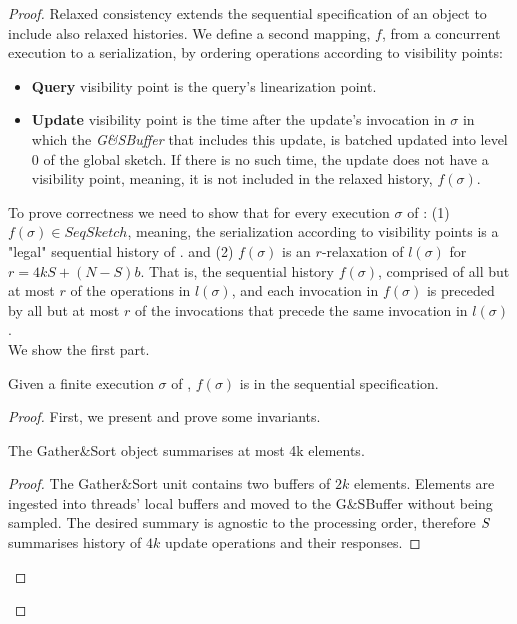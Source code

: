 \begin{proof}
Relaxed consistency extends the sequential specification of an object to include also relaxed histories.
We define a second mapping, $f$, from a concurrent execution to a serialization, by ordering operations according to visibility points:
\begin{itemize}
\item \textbf{Query} visibility point is the query's linearization point.
\item \textbf{Update} visibility point is the time after the update's invocation in $\sigma$ in which the \emph{G\&SBuffer} that includes this update, is batched updated into level 0 of the global sketch. If there is no such time, the update does not have a visibility point, meaning, it is not included in the relaxed history, $f(\sigma)$.
\end{itemize}

To prove correctness we need to show that for every execution $\sigma$ of \mysketch: 
(1) $f(\sigma) \in \mathit{SeqSketch}$, meaning, the serialization according to visibility points is a "legal" sequential history of \mysketch. 
and 
(2) $f(\sigma)$ is an $r$-relaxation of $l(\sigma)$ for $r=4kS + (N-S)b$. That is, the sequential history $f(\sigma)$, comprised of all but at most $r$ of the operations in $l(\sigma)$, and each invocation in $f(\sigma)$ is preceded by all but at most $r$ of the invocations that precede the same invocation in $l(\sigma)$.
\\

We show the first part. 
\begin{lemma} \label{Lem: visibility_in_seq_spec}
Given a finite execution $\sigma$ of \mysketch, $f(\sigma)$ is in the sequential specification. 
\end{lemma}

\begin{proof}
First, we present and prove some invariants. 

\begin{invariant}\label{Inv: GSBuffer_summary}
The Gather\&Sort object summarises at most 4k elements.
\end{invariant}
\begin{proof}
The Gather\&Sort unit contains two buffers of \(2k\) elements. Elements are ingested into threads' local buffers and moved to the G\&SBuffer without being sampled. The desired summary is agnostic to the processing order, therefore \(\mathnormal{S}\) summarises history of \(4k\) update operations and their responses. 
\end{proof}


\end{proof}
\end{proof}
